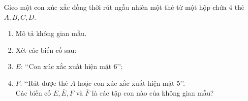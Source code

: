 \begin{bt}%
	Gieo một con xúc xắc đồng thời rút ngẫu nhiên một thẻ từ một hộp chứa 4 thẻ $A, B, C, D$.
	\begin{enumerate}
	\item Mô tả không gian mẫu.
	\item Xét các biến cố sau:
	\item[] $E$: \lq\lq Con xúc xắc xuất hiện mặt 6\rq\rq;
	\item[] $F$: \lq\lq Rút được thẻ ${A}$ hoặc con xúc xắc xuất hiện mặt 5\rq\rq.\\
	Các biến cố $E, \overline{E}, F$ và $\overline{F}$ là các tập con nào của không gian mẫu?	
	\end{enumerate}
\end{bt}

